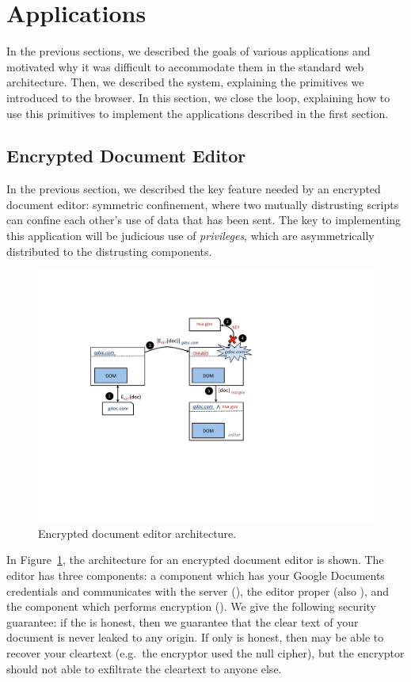 \section{Applications}
\label{sec:apps}

In the previous sections, we described the goals of various applications
and motivated why it was difficult to accommodate them in the standard
web architecture.  Then, we described the \sys{} system, explaining the
primitives we introduced to the browser.  In this section, we close the
loop, explaining how to use this primitives to implement the
applications described in the first section.

\subsection{Encrypted Document Editor}

In the previous section, we described the key feature needed by an
encrypted document editor: symmetric confinement, where two mutually
distrusting scripts can confine each other's use of data that has been
sent.  The key to implementing this application will be judicious use of
\emph{privileges}, which are asymmetrically distributed to the
distrusting components.

\begin{figure}
\centerline{\includegraphics[width=\columnwidth]{editor}}
\caption{\label{fig:editor} Encrypted document editor architecture.
}
\end{figure}

In Figure~\ref{fig:editor}, the architecture for an encrypted document
editor is shown.  The editor has three components: a component which has
your Google Documents credentials and communicates with the server (), the
editor proper (also ), and the component which performs encryption ().  We give the
following security guarantee: if the  is honest, then we
guarantee that the clear text of your document is never leaked to any
origin.  If only  is honest, then  may
be able to recover your cleartext (e.g.\ the encryptor used the null
cipher), but the encryptor should not able to exfiltrate the cleartext
to anyone else.


